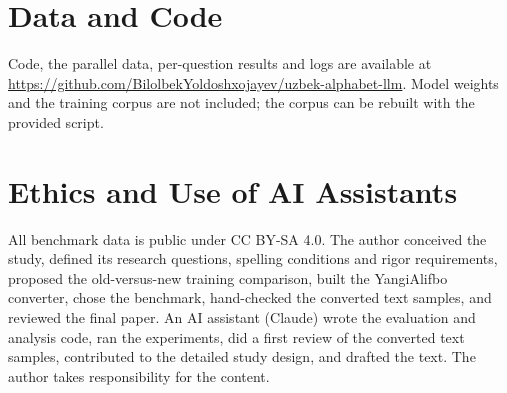 \section*{Data and Code}
Code, the parallel data, per-question results and logs are available at \url{https://github.com/BilolbekYoldoshxojayev/uzbek-alphabet-llm}. Model weights and the training corpus are not included; the corpus can be rebuilt with the provided script.

\section*{Ethics and Use of AI Assistants}
All benchmark data is public under CC BY-SA 4.0. The author conceived the study, defined its research questions, spelling conditions and rigor requirements, proposed the old-versus-new training comparison, built the YangiAlifbo converter, chose the benchmark, hand-checked the converted text samples, and reviewed the final paper. An AI assistant (Claude) wrote the evaluation and analysis code, ran the experiments, did a first review of the converted text samples, contributed to the detailed study design, and drafted the text. The author takes responsibility for the content.

